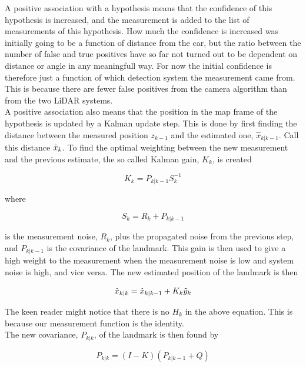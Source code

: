 A positive association with a hypothesis means that the confidence of this hypothesis is increased, and the measurement is added to the list of measurements of this hypothesis. How much the confidence is increased was initially going to be a function of distance from the car, but the ratio between the number of false and true positives have so far not turned out to be dependent on distance or angle in any meaningfull way. For now the initial confidence is therefore just a function of which detection system the measurement came from. This is because there are fewer false positives from the camera algorithm than from the two LiDAR systems. \\

A positive association also means that the position in the map frame of the hypothesis is updated by a Kalman update step. This is done by first finding the distance between the measured position $z_{k-1}$ and the estimated one, $\hat{x}_{k|k-1}$. Call this distance $\Tilde{x}_k$. To find the optimal weighting between the new measurement and the previous estimate, the so called Kalman gain, $K_k$, is created

\begin{equation}
    K_k = P_{k|k-1}S^{-1}_k
\end{equation}

where 

\begin{equation}
    S_k = R_k + P_{k|k-1}
\end{equation}

is the measurement noise, $R_k$, plus the propagated noise from the previous step, and $P_{k|k-1}$ is the covariance of the landmark. This gain is then used to give a high weight to the measurement when the measurement noise is low and system noise is high, and vice versa. The new estimated position of the landmark is then

\begin{equation}
    \hat{x}_{k|k} = \hat{x}_{k|k-1} + K_k\Tilde{y}_k
\end{equation}

The keen reader might notice that there is no $H_k$ in the above equation. This is because our measurement function is the identity. \\

The new covariance, $P_{k|k}$, of the landmark is then found by  

\begin{equation}
    P_{k|k} = (I-K)(P_{k|k-1} + Q)
\end{equation}


